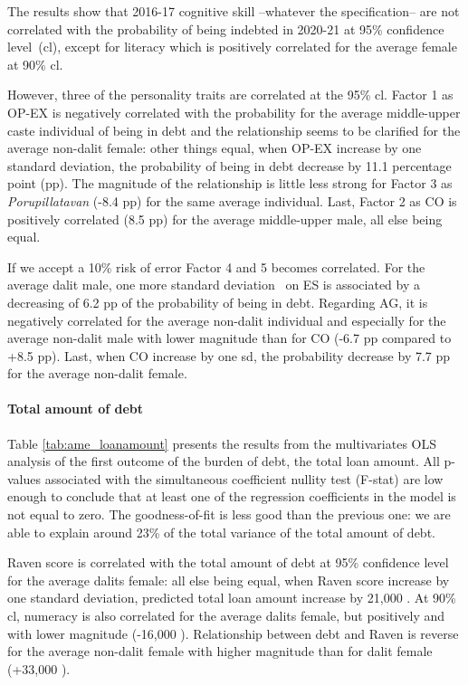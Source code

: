 \documentclass[a4paper, 11pt, onecolumn]{article}
\newcommand{\sd}{standard deviation}
\newcommand{\aebe}{all else being equal}
\newcommand{\ote}{other things equal}
\newcommand{\cl}{confidence level}
\newcommand{\PTCS}{PT\&CS}
\begin{document}
The results show that 2016-17 cognitive skill --whatever the specification-- are not correlated with the probability of being indebted in 2020-21 at 95\% \cl~(cl), except for literacy which is positively correlated for the average female at 90\% cl.

However, three of the personality traits are correlated at the 95\% cl. 
Factor 1 as OP-EX is negatively correlated with the probability for the average middle-upper caste individual of being in debt and the relationship seems to be clarified for the average non-dalit female: \ote, when OP-EX increase by one \sd, the probability of being in debt decrease by 11.1 percentage point (pp).
The magnitude of the relationship is little less strong for Factor 3 as \textit{Porupillatavan} (-8.4 pp) for the same average individual. 
Last, Factor 2 as CO is positively correlated (8.5 pp) for the average middle-upper male, \aebe.

If we accept a 10\% risk of error Factor 4 and 5 becomes correlated.
For the average dalit male, one more \sd~ on ES is associated by a decreasing of 6.2 pp of the probability of being in debt.
Regarding AG, it is negatively correlated for the average non-dalit individual and especially for the average non-dalit male with lower magnitude than for CO (-6.7 pp compared to +8.5 pp).
Last, when CO increase by one sd, the probability decrease by 7.7 pp for the average non-dalit female.



\paragraph{Total amount of debt}
Table \ref{tab:ame_loanamount} presents the results from the multivariates OLS analysis of the first outcome of the burden of debt, the total loan amount.
All p-values associated with the simultaneous coefficient nullity test (F-stat) are low enough to conclude that at least one of the regression coefficients in the model is not equal to zero.
The goodness-of-fit is less good than the previous one: we are able to explain around 23\% of the total variance of the total amount of debt.

Raven score is correlated with the total amount of debt at 95\% \cl~ for the average dalits female: \aebe, when Raven score increase by one \sd, predicted total loan amount increase by 21,000 \rupee.
At 90\% cl, numeracy is also correlated for the average dalits female, but positively and with lower magnitude (-16,000 \rupee).
Relationship between debt and Raven is reverse for the average non-dalit female with higher magnitude than for dalit female (+33,000 \rupee).
\end{document}
